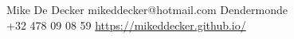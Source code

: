 \documentclass[grey]{hipstercv}
\newlength{\rightcolwidth}
\begin{document}
\begin{paracol}{2}
\vfill{} %

\setlength{\parindent}{0pt}
\begin{minipage}[t]{\rightcolwidth}
\begin{center}\fontfamily{\sfdefault}\selectfont \color{black!70}
{
    \small Mike De Decker  mikeddecker@hotmail.com 
    Dendermonde \\  +32 478 09 08 59
     \protect\url{https://mikeddecker.github.io/}
}
\end{center}
\end{minipage}


\end{paracol}
\end{document}
